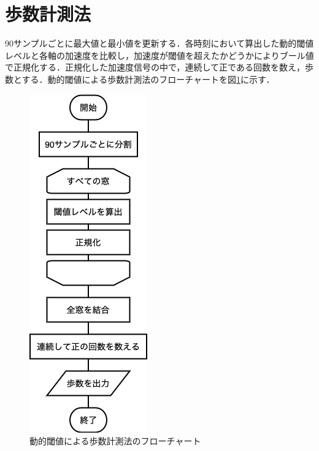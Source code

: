 \section{歩数計測法}
90サンプルごとに最大値と最小値を更新する．各時刻において算出した動的閾値レベルと各軸の加速度を比較し，加速度が閾値を超えたかどうかによりブール値で正規化する．正規化した加速度信号の中で，連続して正である回数を数え，歩数とする．動的閾値による歩数計測法のフローチャートを図\ref{fig:Dy}に示す．

\begin{figure}[tbhp]
  \begin{center}
  \includegraphics[scale=0.7]{image/Fig-Dy.png}
  \caption{動的閾値による歩数計測法のフローチャート}
  \label{fig:Dy}
  \end{center}
\end{figure}